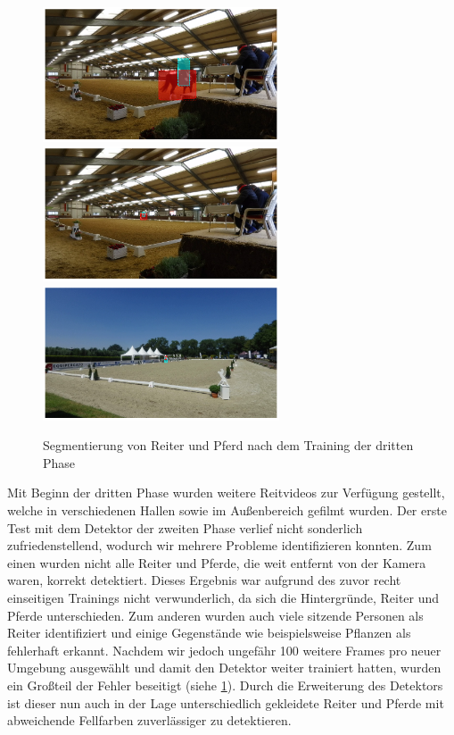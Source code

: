 \begin{figure}[b]
\centering
\includegraphics[height=4cm,trim={6cm 0 6cm 0},clip]{./img/IndoorMask6.png}
\includegraphics[height=4cm,trim={6cm 0 6cm 0},clip]{./img/IndoorMask3.png}
\includegraphics[height=4cm,trim={6cm 0 6cm 0},clip]{./img/OutdoorMask2.png}
\caption{Segmentierung von Reiter und Pferd nach dem Training der dritten Phase}
\label{fig:SegmentierungPhase3}
\end{figure}

Mit Beginn der dritten Phase wurden weitere Reitvideos zur Verfügung gestellt, welche in verschiedenen Hallen sowie im Außenbereich gefilmt wurden. Der erste Test mit dem Detektor der zweiten Phase verlief nicht sonderlich zufriedenstellend, wodurch wir mehrere Probleme identifizieren konnten. Zum einen wurden nicht alle Reiter und Pferde, die weit entfernt von der Kamera waren, korrekt detektiert. Dieses Ergebnis war aufgrund des zuvor recht einseitigen Trainings nicht verwunderlich, da sich die Hintergründe, Reiter und Pferde unterschieden. Zum anderen wurden auch viele sitzende Personen als Reiter identifiziert und einige Gegenstände wie beispielsweise Pflanzen als fehlerhaft erkannt. Nachdem wir jedoch ungefähr 100 weitere Frames pro neuer Umgebung ausgewählt und damit den Detektor weiter trainiert hatten, wurden ein Großteil der Fehler beseitigt (siehe \ref{fig:SegmentierungPhase3}). Durch die Erweiterung des Detektors ist dieser nun auch in der Lage unterschiedlich gekleidete Reiter und Pferde mit abweichende Fellfarben zuverlässiger zu detektieren.



